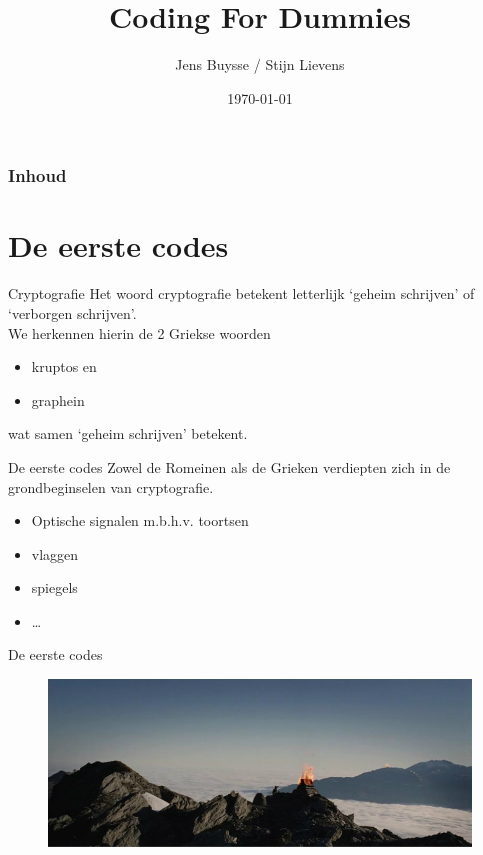 \documentclass{beamer}
\title[Intro]{Coding For Dummies}
\author{Jens {Buysse} / Stijn Lievens}
\date{\today}
\begin{document}

\HoGentLogo

\titleframe


\begin{frame}
  \frametitle{Inhoud}

  \tableofcontents
\end{frame}


\section{De eerste codes}
\begin{frame}{Cryptografie}
	Het woord \textcolor{HoGentBlue}{cryptografie} betekent letterlijk  \textcolor{HoGentBlue}{‘geheim schrijven’} of  \textcolor{HoGentBlue}{‘verborgen schrijven’}.\\
	We herkennen hierin de 2 Griekse woorden 
	\begin{itemize}
		\item kruptos  en %
		\item graphein
	\end{itemize}
	 wat samen ‘geheim schrijven’ betekent.
\end{frame}

\begin{frame}{De eerste codes}
	Zowel de Romeinen als de Grieken verdiepten zich in de grondbeginselen van cryptografie. 
	
	\begin{itemize}
		\item Optische signalen m.b.h.v. toortsen
		\item vlaggen
		\item spiegels
		\item \dots
	\end{itemize}
\end{frame}

\begin{frame}{De eerste codes}
	\begin{figure}
		\includegraphics[width=\textwidth]{img/toorts.jpg}
	\end{figure}
\end{frame}
\end{document}
